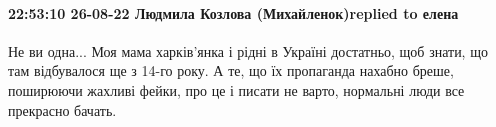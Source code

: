  
 
 
 
 

\paragraph{22:53:10 26-08-22 Людмила Козлова (Михайленок)replied to елена}

Не ви одна... Моя мама харків'янка і рідні в Україні достатньо, щоб знати, що
там відбувалося ще з 14-го року. А те, що їх пропаганда нахабно бреше,
поширюючи жахливі фейки, про це і писати не варто, нормальні люди все прекрасно
бачать.

